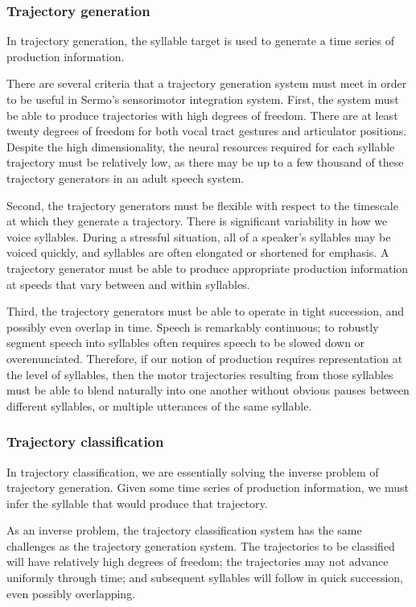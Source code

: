 \subsubsection{Trajectory generation}

In trajectory generation,
the syllable target
is used to generate
a time series of production information.

There are several criteria
that a trajectory generation system
must meet in order to be
useful in Sermo's sensorimotor integration system.
First, the system must be able to produce
trajectories with high degrees of freedom.
There are at least twenty degrees of freedom
for both vocal tract gestures
and articulator positions.
Despite the high dimensionality,
the neural resources required
for each syllable trajectory
must be relatively low,
as there may be up to a few thousand
of these trajectory generators
in an adult speech system.

Second, the trajectory generators
must be flexible with respect to
the timescale at which
they generate a trajectory.
There is significant variability
in how we voice syllables.
During a stressful situation,
all of a speaker's syllables may be
voiced quickly, and
syllables are often elongated
or shortened for emphasis.
A trajectory generator must be
able to produce appropriate
production information
at speeds that vary
between and within syllables.

Third, the trajectory generators
must be able to operate
in tight succession,
and possibly even overlap in time.
Speech is remarkably continuous;
to robustly segment speech into
syllables often requires
speech to be slowed down
or overenunciated.
Therefore, if our notion of production
requires representation at the level of syllables,
then the motor trajectories
resulting from those syllables
must be able to blend naturally into one another
without obvious pauses between
different syllables,
or multiple utterances of the same syllable.

\subsubsection{Trajectory classification}

In trajectory classification,
we are essentially solving the inverse problem
of trajectory generation.
Given some time series of production information,
we must infer the syllable
that would produce that trajectory.

As an inverse problem,
the trajectory classification system
has the same challenges
as the trajectory generation system.
The trajectories to be classified
will have relatively high degrees of freedom;
the trajectories may not advance uniformly
through time;
and subsequent syllables will follow
in quick succession,
even possibly overlapping.

